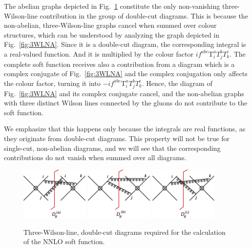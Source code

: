 \documentclass[a4paper,11pt]{article}
\def\cT{\bm{\mathrm{T}}}
\numberwithin{equation}{section}
\begin{document}
The abelian graphs depicted in Fig.~\ref{fig:3WL2cut} constitute the only
non-vanishing three-Wilson-line contribution in the group of double-cut diagrams.
This is because the non-abelian, three-Wilson-line graphs cancel when summed
over colour structures, which can be understood by analyzing the graph depicted
in Fig.~\ref{fig:3WLNA}. 
%
Since it is a double-cut diagram, the corresponding integral is a real-valued
function. And it is multiplied by the colour factor $i f^{abc}\cT^a_i T^b_j
T^c_k$. The complete soft function receives also a contribution from a diagram
which is a complex conjugate of Fig.~\ref{fig:3WLNA} and the complex
conjugation only affects the colour factor, turning it into $-i f^{abc}\cT^a_i
T^b_j T^c_k$.
%
Hence, the diagram of Fig.~\ref{fig:3WLNA} and its complex
conjugate cancel, and the non-abelian graphs with three distinct Wilson lines
connected by the gluons do not contribute to the soft function.

We emphasize that this happens only because the integrals are real
functions, as they originate from double-cut diagrams. This property will not be
true for single-cut, non-abelian diagrams, and we will see that the
corresponding contributions do not vanish when summed over all diagrams.

\begin{figure}[t]
  \begin{center}
    \includegraphics[width=0.30\textwidth]{plots/sf-nnlo-d8a.png}
    \hfill
    \includegraphics[width=0.30\textwidth]{plots/sf-nnlo-d8b.png}
    \hfill
    \includegraphics[width=0.30\textwidth]{plots/sf-nnlo-d8c.png}
  \end{center}
  \caption{Three-Wilson-line, double-cut diagrams required for the calculation
  of the NNLO soft function.
  }
  \label{fig:3WL2cut}
\end{figure}
\end{document}
